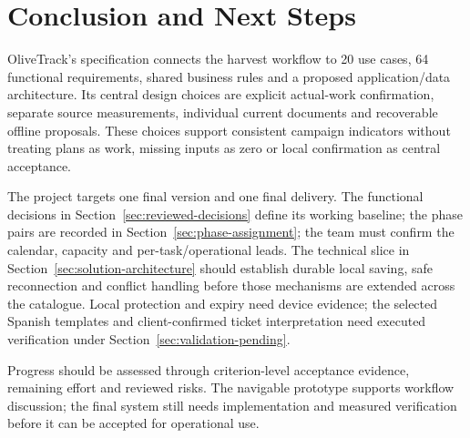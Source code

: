 \section{Conclusion and Next Steps}\label{sec:conclusion}
OliveTrack's specification connects the harvest workflow to 20 use cases,
64 functional requirements, shared business rules and a proposed application/data
architecture. Its central design choices are explicit actual-work confirmation,
separate source measurements, individual current documents and recoverable offline
proposals. These choices support consistent campaign indicators without treating
plans as work, missing inputs as zero or local confirmation as central acceptance.

The project targets one final version and one final delivery. The functional decisions in Section~\ref{sec:reviewed-decisions} define its working baseline; the phase pairs are recorded in Section~\ref{sec:phase-assignment}; the team must confirm the calendar, capacity and per-task/operational leads. The technical slice in
Section~\ref{sec:solution-architecture} should establish durable local saving,
safe reconnection and conflict handling before those mechanisms are extended
across the catalogue. Local protection and expiry need device evidence; the selected Spanish templates and client-confirmed ticket interpretation need executed verification under
Section~\ref{sec:validation-pending}.

Progress should be assessed through criterion-level acceptance evidence, remaining
effort and reviewed risks. The navigable prototype supports workflow discussion;
the final system still needs implementation and measured verification before
it can be accepted for operational use.
